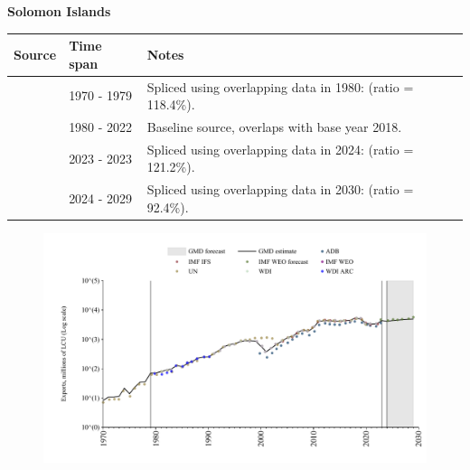 \documentclass[12pt,a4paper,landscape]{article}
\begin{document}
\begin{adjustbox}{max totalsize={\paperwidth}{\paperheight},center}
\begin{minipage}[t][\textheight][t]{\textwidth}
\vspace*{0.5cm}
{}
\begin{center}
{\Large\bfseries Solomon Islands}
\end{center}
\vspace{0.5cm}
\begin{table}[H]
\centering
\small
\begin{tabular}{|l|l|l|}
\hline
\textbf{Source} & \textbf{Time span} & \textbf{Notes} \\
\hline
\rowcolor{white}\cite{UN}& 1970 - 1979 &Spliced using overlapping data in 1980: (ratio = 118.4\%).\\
\rowcolor{lightgray}\cite{WDI}& 1980 - 2022 &Baseline source, overlaps with base year 2018.\\
\rowcolor{white}\cite{ADB}& 2023 - 2023 &Spliced using overlapping data in 2024: (ratio = 121.2\%).\\
\rowcolor{lightgray}\cite{IMF_WEO_forecast}& 2024 - 2029 &Spliced using overlapping data in 2030: (ratio = 92.4\%).\\
\hline
\end{tabular}
\end{table}
\begin{figure}[H]
\centering
\includegraphics[width=\textwidth,height=0.6\textheight,keepaspectratio]{graphs/SLB_exports.pdf}
\end{figure}
\end{minipage}
\end{adjustbox}
\end{document}
